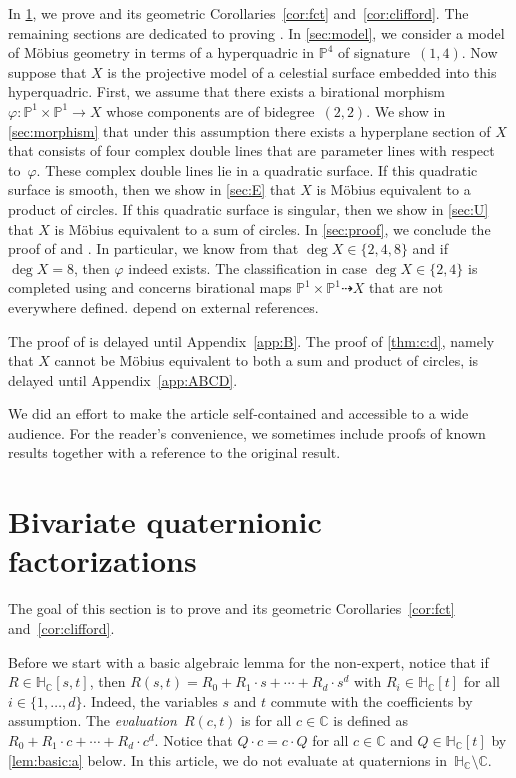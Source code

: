\documentclass[11pt]{article}
\newcommand{\RL}[2]{\Cref{lem:#1}\ref{lem:#1:#2}}
\newcommand{\C}{\mathbb{C}}
\renewcommand{\P}{\mathbb{P}}
\newcommand{\HC}{\mathbb{H}_{\C}}
\renewcommand{\c}{\colon}
\newcommand{\dto}{\dasharrow}
\newcommand{\df}{\emph}
\begin{document}
In \textsection\ref{sec:factor}, we prove 
and its geometric Corollaries~\ref{cor:fct} and~\ref{cor:clifford}.
The remaining sections are dedicated to proving .
In \textsection\ref{sec:model}, we consider a model
of M\"obius geometry
in terms of a hyperquadric in $\P^4$ of signature~$(1,4)$.
Now suppose that $X$ is the projective model of a celestial surface
embedded into this hyperquadric.
First, we assume that there exists a birational morphism $\varphi\c \P^1\times\P^1\to X$
whose components are of bidegree~$(2,2)$.
We show in \textsection\ref{sec:morphism} that
under this assumption there exists a hyperplane section of $X$
that consists of four complex double lines that are parameter lines with respect to~$\varphi$.
These complex double lines lie in a quadratic surface.
If this quadratic surface is smooth, then we show in \textsection\ref{sec:E}
that $X$ is M\"obius equivalent to a product of circles.
If this quadratic surface is singular, then we show in \textsection\ref{sec:U}
that $X$ is M\"obius equivalent to a sum of circles.
In \textsection\ref{sec:proof}, we conclude the proof of  and .
In particular, we know from 
that $\deg X\in\{2,4,8\}$ and if $\deg X=8$,
then $\varphi$ indeed exists.
The classification in case $\deg X\in\{2,4\}$
is completed using  and concerns birational
maps $\P^1\times\P^1\dto X$ that are not everywhere defined.
 depend on external references.

The proof of  is delayed until
Appendix~\ref{app:B}.
The proof of \ref{thm:c:d}, namely that $X$ cannot be
M\"obius equivalent to both a sum and product of circles,
is delayed until Appendix~\ref{app:ABCD}.

We did an effort to make the article self-contained and
accessible to a wide audience.
For the reader's convenience, we sometimes include proofs of known results
together with a reference to the original result.


\section{Bivariate quaternionic factorizations}
\label{sec:factor}

The goal of this section is to prove 
and its geometric Corollaries~\ref{cor:fct} and~\ref{cor:clifford}.

Before we start with a basic algebraic lemma for the non-expert,
notice that if $R\in\HC[s,t]$, then
$R(s,t)=R_0+R_1\cdot s +\cdots+R_d\cdot s^d$ with $R_i\in\HC[t]$ for all $i\in\{1,\ldots,d\}$.
Indeed, the variables $s$ and $t$ commute with the coefficients by assumption.
The \df{evaluation}~$R(c,t)$ is for all $c\in \C$ is defined as $R_0+R_1\cdot c +\cdots+R_d\cdot c^d$.
Notice that $Q\cdot c=c\cdot Q$ for all $c\in\C$ and $Q\in\HC[t]$ by \RL{basic}{a} below.
In this article, we do not evaluate at quaternions in~$\HC\setminus\C$.
\end{document}
